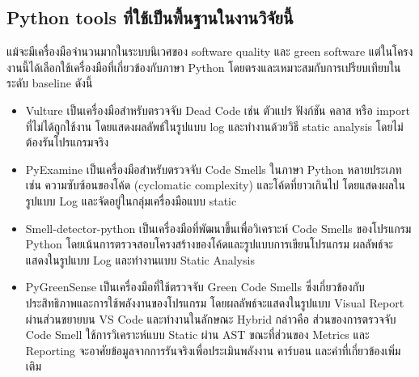 \subsection{Python tools ที่ใช้เป็นพื้นฐานในงานวิจัยนี้}
แม้จะมีเครื่องมือจำนวนมากในระบบนิเวศของ {\italicfont software quality} และ {\italicfont green software} แต่ในโครงงานนี้ได้เลือกใช้เครื่องมือที่เกี่ยวข้องกับภาษา Python โดยตรงและเหมาะสมกับการเปรียบเทียบในระดับ baseline ดังนี้

\begin{itemize}
    \item {\boldfont Vulture} เป็นเครื่องมือสำหรับตรวจจับ {\italicfont Dead Code} เช่น ตัวแปร ฟังก์ชัน คลาส หรือ {\italicfont import} ที่ไม่ได้ถูกใช้งาน โดยแสดงผลลัพธ์ในรูปแบบ {\italicfont log} และทำงานด้วยวิธี {\italicfont static analysis} โดยไม่ต้องรันโปรแกรมจริง
    \item {\boldfont PyExamine} เป็นเครื่องมือสำหรับตรวจจับ {\italicfont Code Smells} ในภาษา Python หลายประเภท เช่น ความซับซ้อนของโค้ด ({\italicfont cyclomatic complexity}) และโค้ดที่ยาวเกินไป โดยแสดงผลในรูปแบบ {\italicfont Log} และจัดอยู่ในกลุ่มเครื่องมือแบบ {\italicfont static}
    \item {\boldfont Smell-detector-python} เป็นเครื่องมือที่พัฒนาขึ้นเพื่อวิเคราะห์ {\italicfont Code Smells} ของโปรแกรม Python โดยเน้นการตรวจสอบโครงสร้างของโค้ดและรูปแบบการเขียนโปรแกรม ผลลัพธ์จะแสดงในรูปแบบ {\italicfont Log} และทำงานแบบ {\italicfont Static Analysis}
    \item {\boldfont PyGreenSense} เป็นเครื่องมือที่ใช้ตรวจจับ {\italicfont Green Code Smells} ซึ่งเกี่ยวข้องกับประสิทธิภาพและการใช้พลังงานของโปรแกรม โดยผลลัพธ์จะแสดงในรูปแบบ {\italicfont Visual Report} ผ่านส่วนขยายบน VS Code และทำงานในลักษณะ {\italicfont Hybrid} กล่าวคือ ส่วนของการตรวจจับ {\italicfont Code Smell} ใช้การวิเคราะห์แบบ {\italicfont Static} ผ่าน AST ขณะที่ส่วนของ {\italicfont Metrics} และ {\italicfont Reporting} จะอาศัยข้อมูลจากการรันจริงเพื่อประเมินพลังงาน คาร์บอน และค่าที่เกี่ยวข้องเพิ่มเติม
\end{itemize}

